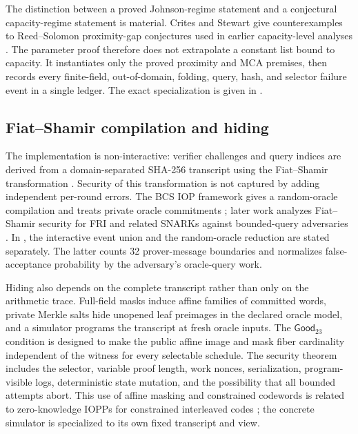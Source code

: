 The distinction between a proved Johnson-regime statement and a conjectural
capacity-regime statement is material.  Crites and Stewart give counterexamples
to Reed--Solomon proximity-gap conjectures used in earlier capacity-level
analyses \cite{CritesStewart2025}.  The \Profile{} parameter proof therefore does
not extrapolate a constant list bound to capacity.  It instantiates only the
proved proximity and MCA premises, then records every finite-field,
out-of-domain, folding, query, hash, and selector failure event in a single
ledger.  The exact specialization is given in
.

\subsection{Fiat--Shamir compilation and hiding}

The implementation is non-interactive: verifier challenges and query indices
are derived from a domain-separated SHA-256 transcript using the
Fiat--Shamir transformation \cite{FiatShamir1987}.  Security of this
transformation is not captured by adding independent per-round errors.  The
BCS IOP framework gives a random-oracle compilation and treats private oracle
commitments \cite{BenSassonChiesaSpooner2016}; later work analyzes Fiat--Shamir security
for FRI and related SNARKs against bounded-query adversaries
\cite{BlockGarretaKatzThalerTiwariZajac2023}.  In \Profile{}, the interactive event union and
the random-oracle reduction are stated separately.  The latter counts 32
prover-message boundaries and normalizes false-acceptance probability by the
adversary's oracle-query work.

Hiding also depends on the complete transcript rather than only on the
arithmetic trace.  Full-field masks induce affine families of committed words,
private Merkle salts hide unopened leaf preimages in the declared oracle
model, and a simulator programs the transcript at fresh oracle inputs.  The
\(\mathsf{Good}_{23}\) condition is designed to make the public affine image and mask
fiber cardinality independent of the witness for every selectable schedule.
The security theorem includes the selector, variable proof length, work
nonces, serialization, program-visible logs, deterministic state mutation,
and the possibility that all bounded attempts abort.  This use of affine
masking and constrained codewords is related to zero-knowledge IOPPs for
constrained interleaved codes \cite{ChiesaFenziWeissenberg2026}; the concrete
\Profile{} simulator is specialized to its own fixed transcript and view.

